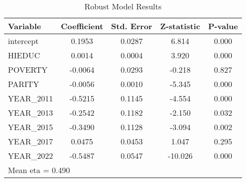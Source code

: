 \begin{table}[htbp]
\centering
\caption{Robust Model Results}
\label{tab:robust_results}
\begin{tabular}{lcccc}
\hline
Variable & Coefficient & Std. Error & Z-statistic & P-value \\
\hline
intercept & 0.1953 & 0.0287 & 6.814 & 0.000 \\
HIEDUC & 0.0014 & 0.0004 & 3.920 & 0.000 \\
POVERTY & -0.0064 & 0.0293 & -0.218 & 0.827 \\
PARITY & -0.0056 & 0.0010 & -5.345 & 0.000 \\
YEAR\_2011 & -0.5215 & 0.1145 & -4.554 & 0.000 \\
YEAR\_2013 & -0.2542 & 0.1182 & -2.150 & 0.032 \\
YEAR\_2015 & -0.3490 & 0.1128 & -3.094 & 0.002 \\
YEAR\_2017 & 0.0475 & 0.0453 & 1.047 & 0.295 \\
YEAR\_2022 & -0.5487 & 0.0547 & -10.026 & 0.000 \\
\hline
\multicolumn{5}{l}{Mean eta = 0.490}
\end{tabular}
\end{table}
